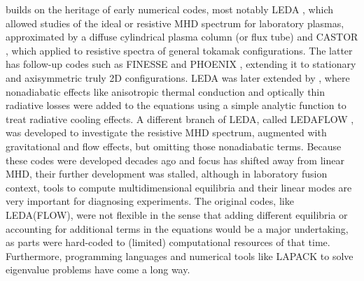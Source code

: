 {\legolas} builds on the heritage of early numerical codes, most notably LEDA \citep{kerner1985}, which allowed studies of the ideal or resistive MHD spectrum for laboratory plasmas, approximated by a diffuse cylindrical plasma column (or flux tube) and CASTOR \citep{kerner1998}, which applied to resistive spectra of general tokamak configurations. The latter has follow-up codes such as FINESSE \citep{belien2002} and PHOENIX \citep{blokland2007_phoenix}, extending it to stationary and axisymmetric truly \gls{2D} configurations. LEDA was later extended by \citet{vanderlinden1992}, where nonadiabatic effects like anisotropic thermal conduction and optically thin radiative losses were added to the equations using a simple analytic function to treat radiative cooling effects. A different branch of LEDA, called LEDAFLOW \citep{nijboer1997}, was developed to investigate the resistive MHD spectrum, augmented with gravitational and flow effects, but omitting those nonadiabatic terms. Because these codes were developed decades ago and focus has shifted away from linear MHD, their further development was stalled, although in laboratory fusion context, tools to compute multidimensional equilibria and their linear modes are very important for diagnosing experiments. The original codes, like LEDA(FLOW), were not flexible in the sense that adding different equilibria or accounting for additional terms in the equations would be a major undertaking, as parts were hard-coded to (limited) computational resources of that time. Furthermore, programming languages and numerical tools like LAPACK \citep{book_lapack} to solve eigenvalue problems have come a long way.

